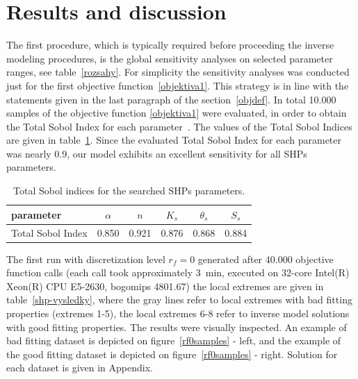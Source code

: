 \documentclass[review,times,3p,twocolumn,10pt]{elsarticle}
\begin{document}


 



\section{Results and discussion} 


The first procedure, which is typically required before proceeding the inverse modeling procedures, is the global sensitivity analyses on  selected parameter ranges, see table~\ref{rozsahy}. For simplicity the sensitivity analyses was conducted just for the first objective function~\eqref{objektiva1}. This strategy is in line with the statements given in the last paragraph of the section~\ref{objdef}. In total 10.000 samples of the objective function \eqref{objektiva1}  were evaluated, in order to obtain the  Total Sobol Index for each parameter~\citep{kniha-citlivost}. The values of the Total Sobol Indices are given in table~\ref{citlivost}. Since the evaluated Total Sobol Index for each parameter was nearly 0.9, our model exhibits an excellent sensitivity for all SHPs parameters. 

\begin{table}[ht]
\begin{center}
\caption{Total Sobol indices for the searched SHPs parameters.}
\begin{small}
\doublespacing
\begin{tabular}{l||c c c c c}
\toprule
parameter & $\alpha$ & $n$ & $K_s$ & $\theta_s$ & $S_s$ \\ \hline
\toprule
Total Sobol Index & 0.850 & 0.921 & 0.876 & 0.868 & 0.884 \\
\toprule
\end{tabular}
\end{small}
\label{citlivost}
\end{center}
\end{table}

The first run with discretization level $r_f=0$ generated after 40.000 objective function calls (each call took approximately 3~min, executed on 32-core Intel(R) Xeon(R) CPU E5-2630, bogomips 4801.67) the local extremes are given in table~\ref{shp-vysledky}, where the gray lines refer to local extremes with bad fitting properties (extremes 1-5), the local extremes 6-8 refer to inverse model solutions with good fitting properties. The results were visually inspected. An example of bad fitting dataset is depicted on figure~\ref{rf0samples} - left, and the example of the good fitting dataset is depicted on figure~\ref{rf0samples} - right. Solution for each dataset is  given in Appendix.
\end{document}
